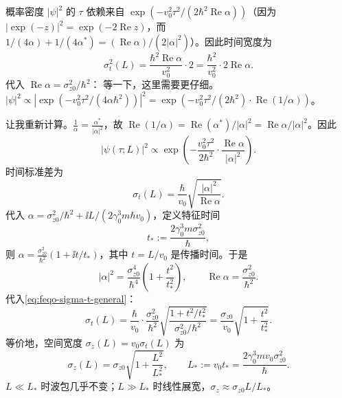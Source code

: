 概率密度 $|\psi|^2$ 的 $\tau$ 依赖来自 $\exp(-v_0^2\tau^2/(2\hbar^2\operatorname{Re}\alpha))$（因为 $|\exp(-z)|^2=\exp(-2\operatorname{Re}z)$，而 $1/(4\alpha)+1/(4\alpha^*)=(\operatorname{Re}\alpha)/(2|\alpha|^2)$）。因此时间宽度为
\begin{equation}
\sigma_t^2(L)=\frac{\hbar^2\operatorname{Re}\alpha}{v_0^2}\cdot 2
=\frac{\hbar^2}{v_0^2}\cdot 2\operatorname{Re}\alpha.
\label{eq:feqo-time-width-general}
\end{equation}
代入 $\operatorname{Re}\alpha = \sigma_{z0}^2/\hbar^2$：
等一下，这里需要更仔细。$|\psi|^2\propto|\exp(-v_0^2\tau^2/(4\alpha\hbar^2))|^2=\exp(-v_0^2\tau^2/(2\hbar^2)\cdot\operatorname{Re}(1/\alpha))$。

让我重新计算。$\frac{1}{\alpha}=\frac{\alpha^*}{|\alpha|^2}$，故 $\operatorname{Re}(1/\alpha)=\operatorname{Re}(\alpha^*)/|\alpha|^2=\operatorname{Re}\alpha/|\alpha|^2$。因此
\begin{equation}
|\psi(\tau;L)|^2\propto\exp\!\left(-\frac{v_0^2\tau^2}{2\hbar^2}\cdot\frac{\operatorname{Re}\alpha}{|\alpha|^2}\right).
\label{eq:feqo-gaussian-density}
\end{equation}
时间标准差为
\begin{equation}
\sigma_t(L)=\frac{\hbar}{v_0}\sqrt{\frac{|\alpha|^2}{\operatorname{Re}\alpha}}.
\label{eq:feqo-sigma-t-general}
\end{equation}
代入 $\alpha=\sigma_{z0}^2/\hbar^2+\ii L/(2\gamma_0^3 m\hbar v_0)$，定义特征时间
\begin{equation}
t_*:=\frac{2\gamma_0^3 m\sigma_{z0}^2}{\hbar},
\label{eq:feqo-t-star}
\end{equation}
则 $\alpha=\frac{\sigma_{z0}^2}{\hbar^2}(1+\ii t/t_*)$，其中 $t=L/v_0$ 是传播时间。于是
\begin{equation}
|\alpha|^2=\frac{\sigma_{z0}^4}{\hbar^4}\left(1+\frac{t^2}{t_*^2}\right),\qquad
\operatorname{Re}\alpha=\frac{\sigma_{z0}^2}{\hbar^2}.
\label{eq:feqo-alpha-modulus}
\end{equation}
代入\cref{eq:feqo-sigma-t-general}：
\begin{equation}
\sigma_t(L)=\frac{\hbar}{v_0}\cdot\frac{\sigma_{z0}^2}{\hbar^2}\sqrt{\frac{1+t^2/t_*^2}{\sigma_{z0}^2/\hbar^2}}
=\frac{\sigma_{z0}}{v_0}\sqrt{1+\frac{t^2}{t_*^2}}.
\label{eq:feqo-sigma-t-final}
\end{equation}
等价地，空间宽度 $\sigma_z(L)=v_0\sigma_t(L)$ 为
\begin{equation}
\boxed{\sigma_z(L)=\sigma_{z0}\sqrt{1+\frac{L^2}{L_*^2}},\qquad
L_*:=v_0 t_*=\frac{2\gamma_0^3 m v_0\sigma_{z0}^2}{\hbar}.}
\label{eq:feqo-gaussian-spreading}
\end{equation}
$L\ll L_*$ 时波包几乎不变；$L\gg L_*$ 时线性展宽，$\sigma_z\approx\sigma_{z0}L/L_*$。


